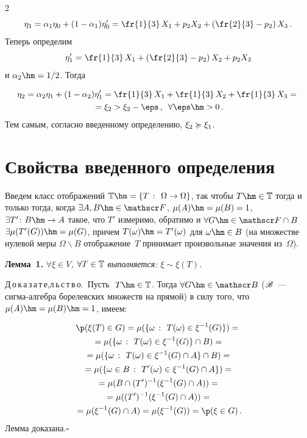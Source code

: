 \begin{multicols}{2}
\noindent
$$
\eta_1 = \alpha_1 \eta_0 + (1 - \alpha_1) \eta_0' 
= \fr{1}{3}\, X_1 + p_2 X_2 + \left(\fr{2}{3}- p_2\right) X_3\,.
$$ 
Теперь определим 
$$
\eta_1' = \fr{1}{3}\, X_1 + \left(\fr{2}{3}- p_2\right) X_2 + p_2 X_3
$$ и
$\alpha_2 \hm= 1/2 $. 
Тогда 



\noindent
\begin{multline*}
\eta_2 = \alpha_2 \eta_1 + (1 - \alpha_2) \eta_1' = 
\fr{1}{3}\, X_1 + \fr{1}{3}\, X_2 + \fr{1}{3}\, X_3 ={}\\
{}=
    \xi_2 > \xi_2 - \eps\,,\enskip \forall \eps\hm>0\,.
    \end{multline*} 
    Тем самым, согласно введенному определению, $\xi_2 \succcurlyeq \xi_1$.

\vspace*{-3pt}

\section{Свойства введенного определения}

\vspace*{-1pt}

Введем класс отображений $ \classT \hm= \Set {T}{\Omega \rightarrow
\Omega} $, так чтобы $T \hm\in \classT $ тогда и только тогда, когда
$\exists A,B \hm\in \sigmaF$, $\mu(A)\hm=\mu(B)=1$, $\exists T' \colon B
\hm\rightarrow A$ такое, что $T'$ измеримо, обратимо и $\forall
G\hm\in\sigmaF\cap B$ $\exists \mu(T'(G)) \hm= \mu(G)$, причем
$T(\omega)\hm=T'(\omega)$  для  $\omega \hm\in B$ (на множестве
нулевой меры $\Omega \backslash B$ отображение~$T$ принимает
произвольные значения из~$\Omega$).

\medskip

\noindent
\textbf{Лемма~1.} \textit{$\forall \xi \in V $, $\forall T \in \mathbb {T} $
выполняется: $\xi \sim \xi(T) $.} 

\smallskip

\noindent
Д\,о\,к\,а\,з\,а\,т\,е,л\,ь\,с\,т\,в\,о.\  
Пусть $\ T \hm\in \classT$.
Тогда $\forall G \hm\in \sigmaB$ ($\mathscr{B}$~--- сиг\-ма-ал\-геб\-ра
борелевских множеств на прямой) в силу того, что
$\mu(A)\hm=\mu(B)\hm=1$, имеем:

\noindent
\begin{multline*}
\p(\xi(T) \in G) = \mu( \Set{\omega}{T(\omega) \in \xi^{-1}(G)} ) = {}\\
{}=\mu(\Set{\omega}{T(\omega) \in \xi^{-1}(G)} \cap B)={} \\
{}=\mu(\Set{\omega}{T(\omega) \in \xi^{-1}(G)\cap A} \cap B)={} \\
{}=\mu(\Set{\omega \in B}{T'(\omega) \in \xi^{-1}(G)\cap A})={} \\
{}=\mu(B\cap (T')^{-1}(\xi^{-1}(G)\cap A))={}\\
{}= \mu((T')^{-1}(\xi^{-1}(G)\cap A))={}\\
{}= \mu(\xi^{-1}(G)\cap A)= \mu(\xi^{-1}(G)) = \p(\xi \in G)\,.
\end{multline*}
Лемма доказана.\hfill$\square$


\end{multicols}
